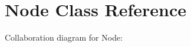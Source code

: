 \hypertarget{classNode}{}\section{Node Class Reference}
\label{classNode}


Collaboration diagram for Node\+:

